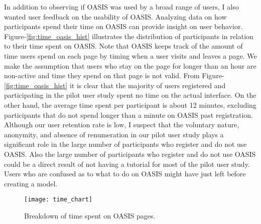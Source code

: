 In addition to observing if OASIS was used by a broad range of users, I also wanted user feedback on the usability of OASIS.
Analyzing data on how participants spend their time  on OASIS can provide insight on user behavior.
Figure-\ref{fig:time_oasis_hist} illustrates the distribution of participants in relation to their time spent on OASIS.
Note that OASIS keeps track of the amount of time users spend on each page by timing when a user visits and leaves a page. We make the assumption that users who stay on the page for longer than an hour are non-active and time they spend on that page is not valid.
From Figure-\ref{fig:time_oasis_hist} it is clear that the majority of users registered and participating in the pilot user study spent no time on the actual interface.
On the other hand, the average time spent per participant is about 12 minutes, excluding participants that do not spend longer than a minute on OASIS past registration.
Although our user retention rate is low, I suspect that the voluntary nature, anonymity, and absence of renumeration in our pilot user study plays a significant role in the large number of participants who register and do not use OASIS.
Also  the large number of participants who register and do not use OASIS  could be a direct result of not having a tutorial for most of the pilot user study.
Users who are confused as to what to do on OASIS might have just left before creating a model.

\begin{figure}[!ht]
	\centering
	\caption{Breakdown of time spent on OASIS pages.}
	\label{fig:time_chart}
	\texttt{[image: time\_chart]}
\end{figure}

